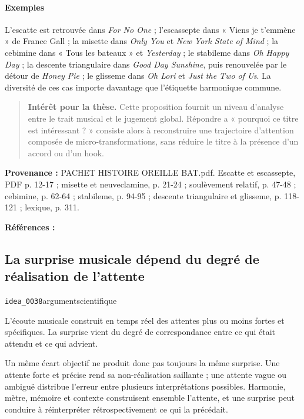 \documentclass[10pt,a4paper]{article}
\begin{document}
\paragraph{Exemples}
L'escatte est retrouvée dans \emph{For No One} ; l'escassepte dans « Viens je t'emmène » de France Gall ; la misette dans \emph{Only You} et \emph{New York State of Mind} ; la cebimine dans « Tous les bateaux » et \emph{Yesterday} ; le stabileme dans \emph{Oh Happy Day} ; la descente triangulaire dans \emph{Good Day Sunshine}, puis renouvelée par le détour de \emph{Honey Pie} ; le glisseme dans \emph{Oh Lori} et \emph{Just the Two of Us}. La diversité de ces cas importe davantage que l'étiquette harmonique commune.

\begin{quote}
\textbf{Intérêt pour la thèse.} Cette proposition fournit un niveau d'analyse entre le trait musical et le jugement global. Répondre a « pourquoi ce titre est intéressant ? » consiste alors à reconstruire une trajectoire d'attention composée de micro-transformations, sans réduire le titre à la présence d'un accord ou d'un hook.
\end{quote}
{\footnotesize\color{metadata}\textbf{Provenance :} PACHET HISTOIRE OREILLE BAT.pdf. Escatte et escassepte, PDF p. 12-17 ; misette et neuveclamine, p. 21-24 ; soulèvement relatif, p. 47-48 ; cebimine, p. 62-64 ; stabileme, p. 94-95 ; descente triangulaire et glisseme, p. 118-121 ; lexique, p. 311.\par}
{\footnotesize\color{metadata}\textbf{Références :} \parencite{pachet2018oreille}\par}

\subsection{La surprise musicale dépend du degré de réalisation de l'attente}
{\small\color{metadata} \texttt{idea\_0038}\quad\textbullet\quad argument\quad\textbullet\quad scientifique\par}

L'écoute musicale construit en temps réel des attentes plus ou moins fortes et spécifiques. La surprise vient du degré de correspondance entre ce qui était attendu et ce qui advient.

Un même écart objectif ne produit donc pas toujours la même surprise. Une attente forte et précise rend sa non-réalisation saillante ; une attente vague ou ambiguë distribue l'erreur entre plusieurs interprétations possibles. Harmonie, mètre, mémoire et contexte construisent ensemble l'attente, et une surprise peut conduire à réinterpréter rétrospectivement ce qui la précédait.
\end{document}
